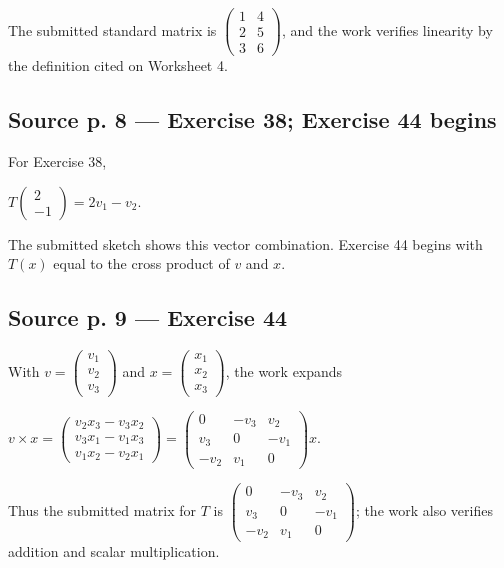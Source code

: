 The submitted standard matrix is \(\begin{pmatrix}
1 & 4 \\
2 & 5 \\
3 & 6
\end{pmatrix}\), and the work verifies linearity by the definition cited on Worksheet 4.

\subsection{Source p. 8 --- Exercise 38; Exercise 44 begins}

For Exercise 38,

\(T\begin{pmatrix}
2 \\
{- 1}
\end{pmatrix} = 2v_{1} - v_{2}\).

The submitted sketch shows this vector combination. Exercise 44 begins with \(T(x)\) equal to the cross product of \(v\) and \(x\).

\subsection{Source p. 9 --- Exercise 44}

With \(v = \begin{pmatrix}
v_{1} \\
v_{2} \\
v_{3}
\end{pmatrix}\) and \(x = \begin{pmatrix}
x_{1} \\
x_{2} \\
x_{3}
\end{pmatrix}\), the work expands

\(v \times x = \begin{pmatrix}
{v_{2}x_{3} - v_{3}x_{2}} \\
{v_{3}x_{1} - v_{1}x_{3}} \\
{v_{1}x_{2} - v_{2}x_{1}}
\end{pmatrix} = \begin{pmatrix}
0 & {- v_{3}} & v_{2} \\
v_{3} & 0 & {- v_{1}} \\
{- v_{2}} & v_{1} & 0
\end{pmatrix}x\).

Thus the submitted matrix for \(T\) is \(\begin{pmatrix}
0 & {- v_{3}} & v_{2} \\
v_{3} & 0 & {- v_{1}} \\
{- v_{2}} & v_{1} & 0
\end{pmatrix}\); the work also verifies addition and scalar multiplication.

